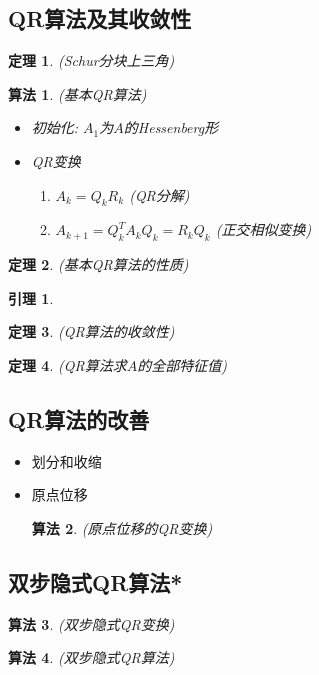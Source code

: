 \documentclass[twoside]{article}
\newtheorem{theorem}{定理}[section]
\newtheorem{algo}{算法}[section]
\newtheorem{lemma}{引理}[section]
\begin{document}
\subsection{QR算法及其收敛性}
\begin{theorem}
  (Schur分块上三角)
\end{theorem}
\begin{algo}
  (基本QR算法)
  \begin{itemize}
    \item 初始化: $A_1$为$A$的Hessenberg形
    \item QR变换
      \begin{enumerate}
        \item $A_k=Q_kR_k$ (QR分解)
        \item $A_{k+1}=Q^T_k A_k Q_k = R_k Q_k$ (正交相似变换)
      \end{enumerate}
  \end{itemize}
\end{algo}
\begin{theorem}
  (基本QR算法的性质)
\end{theorem}
\begin{lemma}
\end{lemma}
\begin{theorem}
  (QR算法的收敛性)
\end{theorem}
\begin{theorem}
  (QR算法求$A$的全部特征值)
\end{theorem}

\subsection{QR算法的改善}
\begin{itemize}
  \item 划分和收缩
  \item 原点位移
    \begin{algo}
      (原点位移的QR变换)
    \end{algo}
\end{itemize}

\subsection{双步隐式QR算法*}
\begin{algo}
  (双步隐式QR变换)
\end{algo}
\begin{algo}
  (双步隐式QR算法)
\end{algo}
\end{document}
